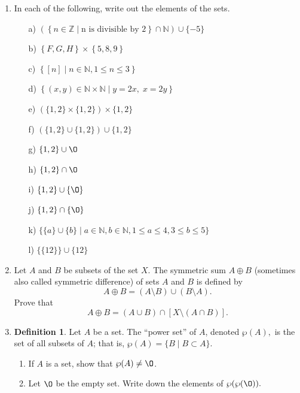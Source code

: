 \documentclass[11pt]{article}
\newcommand{\bbN}{\mathbb{N}}
\newcommand{\bbZ}{\mathbb{Z}}
\renewcommand{\emptyset}{\O}
\theoremstyle{definition}
\newtheorem{definition}[theorem]{Definition}
\numberwithin{equation}{subsection}
\begin{document}
\begin{enumerate}


\item In each of the following, write out the elements of the sets.

\begin{enumerate}
\item[a)] $(\left\{n \in \bbZ\mid \text{n is divisible by 2}\right\} \cap \bbN) \cup \{-5\}$ 
\item[b)] $\left\{F,G,H\right\}\times\left\{5,8,9\right\}$ 
\item[c)] $\left\{[n] \mid n \in \bbN, 1 \leq n \leq 3 \right\}$ 
\item[d)]  $\left\{ (x,y) \in \bbN \times \bbN \mid y = 2x,\; x = 2y \right\}$ 
\item[e)] $(\{1,2\} \times \{1,2\}) \times \{1,2\}$
\item[f)] $(\{1,2\} \cup \{1,2\}) \cup \{1,2\}$
\item[g)] $\{1,2\}\cup\emptyset$
\item[h)] $\{1,2\}\cap\emptyset$
\item[i)] $\{1,2\}\cup\{\emptyset\}$
\item[j)] $\{1,2\}\cap\{\emptyset\}$
\item[k)] $\{\{a\}\cup\{b\}\mid a \in \bbN, b \in \bbN, 1 \leq a \leq 4, 3 \leq b \leq 5\}$
\item[l)] $\{\{12\} \} \cup \{12\}$
\end{enumerate} 


\item Let $A$ and $B$ be subsets of the set $X.$ 
The symmetric sum $A\oplus B$ (sometimes also called symmetric difference) of sets $A$ and $B$ is defined by
$$A\oplus B=(A\setminus B)\cup (B\setminus A).$$
Prove that 
$$A\oplus B=(A\cup B)\cap [X\setminus(A\cap B)].$$



\item
\begin{definition}\label{powersetdef}
	Let $A$ be a set.  The ``power set'' of $A$, denoted $\wp(A),$ is the set of all subsets of $A$; that is, $\wp(A) = \{B \mid B \subset A\}$.
\end{definition}


\begin{enumerate}
	\item If $A$ is a set, show that $\wp(A) \neq \emptyset$.
	\item Let $\emptyset$ be the empty set.  Write down the elements of $\wp(\wp(\emptyset)).$
\end{enumerate}







\end{enumerate}
\end{document}

